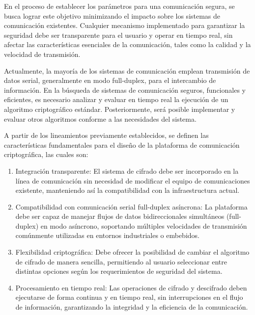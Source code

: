 En el proceso de establecer los parámetros para una comunicación segura, se busca lograr este objetivo minimizando el impacto sobre los sistemas de comunicación existentes. Cualquier mecanismo implementado para garantizar la seguridad debe ser transparente para el usuario y operar en tiempo real, sin afectar las características esenciales de la comunicación, tales como la calidad y la velocidad de transmisión.

Actualmente, la mayoría de los sistemas de comunicación emplean transmisión de datos serial, generalmente en modo full-duplex, para el intercambio de información. En la búsqueda de sistemas de comunicación seguros, funcionales y eficientes, es necesario analizar y evaluar en tiempo real la ejecución de un algoritmo criptográfico estándar. Posteriormente, será posible implementar y evaluar otros algoritmos conforme a las necesidades del sistema.

A partir de los lineamientos previamente establecidos, se definen las características fundamentales para el diseño de la plataforma de comunicación criptográfica, las cuales son:



\begin{enumerate}
\renewcommand{\theenumi}{\alph{enumi}}
\renewcommand{\labelenumi}{{\theenumi})}
\item Integración transparente: El sistema de cifrado debe ser incorporado en la línea de comunicación sin necesidad de modificar el equipo de comunicaciones existente, manteniendo así la compatibilidad con la infraestructura actual.

\item Compatibilidad con comunicación serial full-duplex asíncrona: La plataforma debe ser capaz de manejar flujos de datos bidireccionales simultáneos (full-duplex) en modo asíncrono, soportando múltiples velocidades de transmisión comúnmente utilizadas en entornos industriales o embebidos.

\item Flexibilidad criptográfica: Debe ofrecer la posibilidad de cambiar el algoritmo de cifrado de manera sencilla, permitiendo al usuario seleccionar entre distintas opciones según los requerimientos de seguridad del sistema.

\item Procesamiento en tiempo real: Las operaciones de cifrado y descifrado deben ejecutarse de forma continua y en tiempo real, sin interrupciones en el flujo de información, garantizando la integridad y la eficiencia de la comunicación.
\end{enumerate} 


